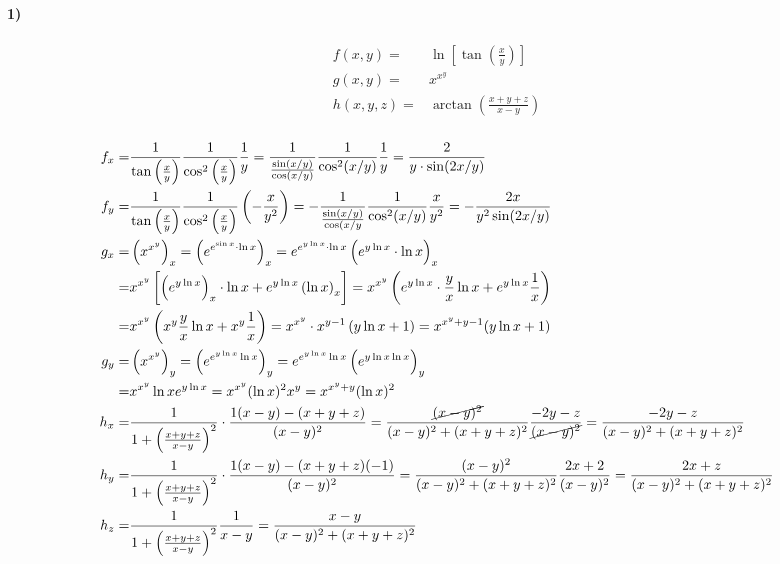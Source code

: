 \documentclass[11pt,a4paper,titlepage]{article}
\begin{document}
\paragraph{1)}
\begin{align*}
f(x,y)=&\ln\left[\tan\left(\frac{x}{y}\right)\right]\\
g(x,y)=&x^{x^y}\\
h(x,y,z)=&\arctan\left(\frac{x+y+z}{x-y}\right)
\end{align*}
\subparagraph{}
\begin{align*}
f_x=&\frac{1}{\tan\left(\frac{x}{y}\right)}\frac{1}{\cos^2\left(\frac{x}{y}\right)}\frac{1}{y}=
\frac{1}{\frac{\sin(x/y)}{\cos(x/y)}}\frac{1}{\cos^2(x/y)}\frac{1}{y}=\frac{2}{y\cdot \sin(2x/y)}\\
f_y=&\frac{1}{\tan\left(\frac{x}{y}\right)}\frac{1}{\cos^2\left(\frac{x}{y}\right)}\left(-\frac{x}{y^2}\right)=-\frac{1}{\frac{\sin(x/y)}{\cos(x/y}}\frac{1}{\cos^2(x/y)}\frac{x}{y^2}=-\frac{2x}{y^2\sin(2x/y)}\\
g_x=&\left(x^{x^y}\right)_x=\left(e^{e^{\sin x} \cdot \ln x}\right)_x=
e^{e^{y\ln x} \cdot \ln x} \left( e^{y\ln x} \cdot \ln x\right)_x\\
=& x^{x^y} \left[
\left(e^{y\ln x}\right)_x\cdot \ln x + e^{y\ln x} \left( \ln x\right)_x
\right]
=
x^{x^y} \left(
e^{y\ln x} \cdot \frac{y}{x} \ln x + e^{y\ln x} \frac{1}{x}
\right)
\\=&
x^{x^y}\left(
x^y\frac{y}{x}\ln x+x^y\frac{1}{x}
\right)=x^{x^y}\cdot x^{y-1}\left(y\ln x+1\right) = x^{x^y+y-1}(y\ln x+1)
\\
g_y
=&
\left(
x^{x^y}
\right)_y
=
\left(
e^{e^{y\ln x}\ln x}
\right)_y
= e^{e^{y\ln x} \ln x} \left(e^{y\ln x \ln x}\right)_y
\\=&
x^{x^y}\ln x e^{y\ln x}=x^{x^y} (\ln x)^2 x^y = x^{x^y+y} (\ln x)^2
\\
h_x
=&
\frac{1}{1+\left(\frac{x+y+z}{x-y}\right)^2}
\cdot\frac{1(x-y)-(x+y+z)}{(x-y)^2}=\frac{\cancel{(x-y)^2}}{(x-y)^2+(x+y+z)^2}
\frac{-2y-z}{\cancel{(x-y)^2}}=\frac{-2y-z}{(x-y)^2+(x+y+z)^2}
\\
h_y
=&
\frac{1}{1+\left(\frac{x+y+z}{x-y}\right)^2}\cdot \frac{1(x-y)-(x+y+z)(-1)}{(x-y)^2}
= \frac{(x-y)^2}{(x-y)^2+(x+y+z)^2}\frac{2x+2}{(x-y)^2}=\frac{2x+z}{(x-y)^2+(x+y+z)^2}
\\
h_z
=&
\frac{1}{1+\left(\frac{x+y+z}{x-y}\right)^2}\frac{1}{x-y}=\frac{x-y}{(x-y)^2+(x+y+z)^2}
\end{align*}
\end{document}
